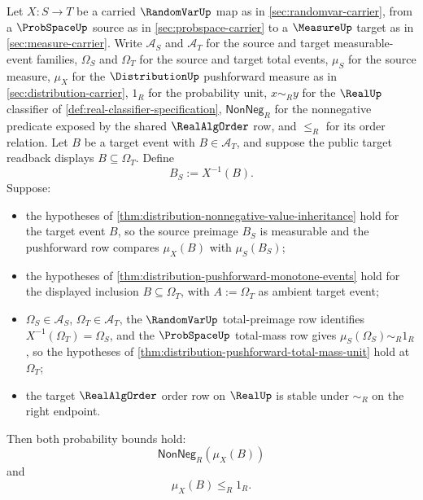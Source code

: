 \begin{theorem}
\label{thm:distribution-pushforward-probability-bounds}
Let $X:S\to T$ be a carried $\RandomVarUp$ map as in \autoref{sec:randomvar-carrier}, from a $\ProbSpaceUp$ source as in \autoref{sec:probspace-carrier} to a $\MeasureUp$ target as in \autoref{sec:measure-carrier}. Write $\mathcal{A}_S$ and $\mathcal{A}_T$ for the source and target measurable-event families, $\Omega_S$ and $\Omega_T$ for the source and target total events, $\mu_S$ for the source measure, $\mu_X$ for the $\DistributionUp$ pushforward measure as in \autoref{sec:distribution-carrier}, $1_R$ for the probability unit, $x\sim_R y$ for the $\RealUp$ classifier of \autoref{def:real-classifier-specification}, $\mathsf{NonNeg}_R$ for the nonnegative predicate exposed by the shared $\RealAlgOrder$ row, and $\le_R$ for its order relation. Let $B$ be a target event with $B\in\mathcal{A}_T$, and suppose the public target readback displays $B\subseteq\Omega_T$. Define
$$
B_S:=X^{-1}(B).
$$
Suppose:
\begin{itemize}
\item the hypotheses of \autoref{thm:distribution-nonnegative-value-inheritance} hold for the target event $B$, so the source preimage $B_S$ is measurable and the pushforward row compares $\mu_X(B)$ with $\mu_S(B_S)$;
\item the hypotheses of \autoref{thm:distribution-pushforward-monotone-events} hold for the displayed inclusion $B\subseteq\Omega_T$, with $A:=\Omega_T$ as ambient target event;
\item $\Omega_S\in\mathcal{A}_S$, $\Omega_T\in\mathcal{A}_T$, the $\RandomVarUp$ total-preimage row identifies $X^{-1}(\Omega_T)=\Omega_S$, and the $\ProbSpaceUp$ total-mass row gives $\mu_S(\Omega_S)\sim_R1_R$, so the hypotheses of \autoref{thm:distribution-pushforward-total-mass-unit} hold at $\Omega_T$;
\item the target $\RealAlgOrder$ order row on $\RealUp$ is stable under $\sim_R$ on the right endpoint.
\end{itemize}
Then both probability bounds hold:
$$
\mathsf{NonNeg}_R(\mu_X(B))
$$
and
$$
\mu_X(B)\le_R1_R.
$$
\end{theorem}
